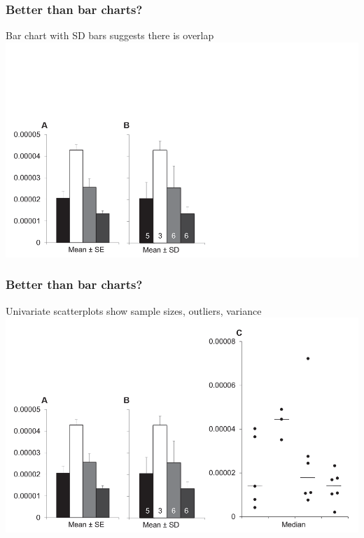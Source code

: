 \begin{frame}
  \frametitle{Better than bar charts?}
  \textcolor{hutton_blue}{Bar chart with SD bars suggests there is overlap}
    \includegraphics[width=1\textwidth]{images/weissgerber_bar_scatter2}    
\end{frame}

\begin{frame}
  \frametitle{Better than bar charts?}
  \textcolor{hutton_purple}{Univariate scatterplots show sample sizes, outliers, variance}
    \includegraphics[width=1\textwidth]{images/weissgerber_bar_scatter3}    
\end{frame}

